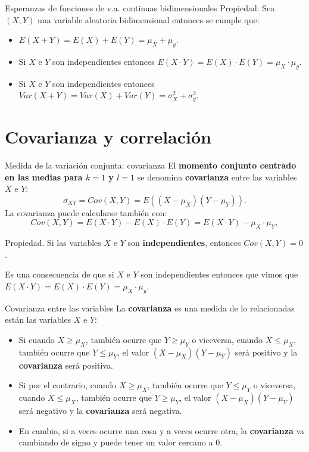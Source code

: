 \documentclass[
  ignorenonframetext,
]{beamer}
\providecommand{\tightlist}{%
  \setlength{\itemsep}{0pt}\setlength{\parskip}{0pt}}
\begin{document}
\begin{frame}{Esperanzas de funciones de v.a. continuas bidimensionales}
\protect\hypertarget{esperanzas-de-funciones-de-v.a.-continuas-bidimensionales-1}{}
Propiedad: Sea \((X,Y)\) una variable aleatoria bidimensional entonces
se cumple que:

\begin{itemize}
\tightlist
\item
  \(E(X+Y)=E(X)+E(Y)=\mu_X+ \mu_y\).
\item
  Si \(X\) e \(Y\) son independientes entonces
  \(E(X\cdot Y)=E(X)\cdot E(Y)=\mu_X\cdot \mu_y\).
\item
  Si \(X\) e \(Y\) son independientes entonces
  \(Var(X+Y)=Var(X)+ Var(Y)=\sigma_X^2+ \sigma_y^2\).
\end{itemize}
\end{frame}

\hypertarget{covarianza-y-correlaciuxf3n}{%
\section{Covarianza y correlación}\label{covarianza-y-correlaciuxf3n}}

\begin{frame}{Medida de la variación conjunta: covarianza}
\protect\hypertarget{medida-de-la-variaciuxf3n-conjunta-covarianza}{}
El \textbf{momento conjunto centrado en las medias para \(k=1\) y
\(l=1\)} se denomina \textbf{covarianza} entre las variables \(X\) e
\(Y\): \[
\sigma_{XY}=Cov(X,Y)=E((X-\mu_X)(Y-\mu_Y)).
\] La covarianza puede calcularse también con: \[
Cov(X,Y)=E(X\cdot Y)-E(X)\cdot E(Y)=E(X\cdot Y)-\mu_X\cdot \mu_Y,
\]

Propiedad. Si las variables \(X\) e \(Y\) son \textbf{independientes},
entonces \(Cov(X,Y)=0\).

Es una consecuencia de que si \(X\) e \(Y\) son independientes entonces
que vimos que \(E(X\cdot Y)=E(X)\cdot E(Y) =\mu_X\cdot \mu_y\).
\end{frame}

\begin{frame}{Covarianza entre las variables}
\protect\hypertarget{covarianza-entre-las-variables}{}
La \textbf{covarianza} es una medida de lo relacionadas están las
variables \(X\) e \(Y\):

\begin{itemize}
\item
  Si cuando \(X\geq \mu_X\), también ocurre que \(Y\geq \mu_Y\) o
  viceversa, cuando \(X\leq \mu_X\), también ocurre que \(Y\leq \mu_Y\),
  el valor \((X-\mu_X)(Y-\mu_Y)\) será positivo y la \textbf{covarianza}
  será positiva.
\item
  Si por el contrario, cuando \(X\geq \mu_X\), también ocurre que
  \(Y\leq \mu_Y\) o viceversa, cuando \(X\leq \mu_X\), también ocurre
  que \(Y\geq \mu_Y\), el valor \((X-\mu_X)(Y-\mu_Y)\) será negativo y
  la \textbf{covarianza} será negativa.
\item
  En cambio, si a veces ocurre una cosa y a veces ocurre otra, la
  \textbf{covarianza} va cambiando de signo y puede tener un valor
  cercano a 0.
\end{itemize}
\end{frame}
\end{document}
